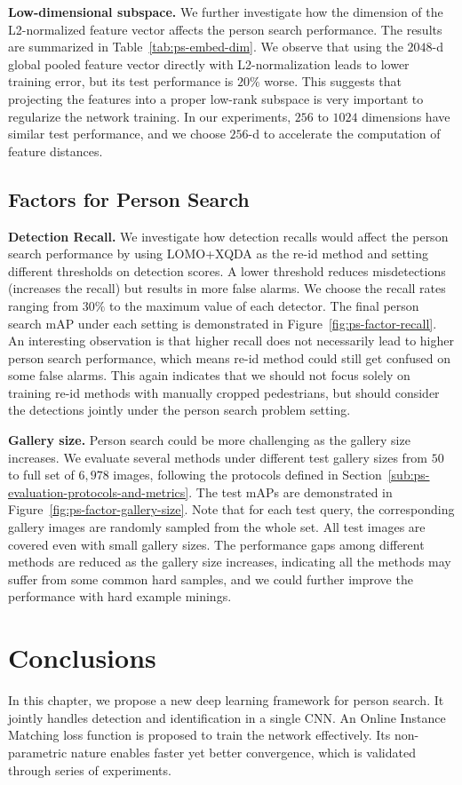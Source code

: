 \textbf{Low-dimensional subspace.} We further investigate how the dimension of the L2-normalized feature vector affects the person search performance. The results are summarized in Table~\ref{tab:ps-embed-dim}. We observe that using the $2048$-d global pooled feature vector directly with L2-normalization leads to lower training error, but its test performance is $20\%$ worse. This suggests that projecting the features into a proper low-rank subspace is very important to regularize the network training. In our experiments, $256$ to $1024$ dimensions have similar test performance, and we choose $256$-d to accelerate the computation of feature distances.

\subsection{Factors for Person Search} %
\label{sub:ps-factors-for-person-search}
\textbf{Detection Recall.} We investigate how detection recalls would affect the person search performance by using LOMO+XQDA as the re-id method and setting different thresholds on detection scores. A lower threshold reduces misdetections (increases the recall) but results in more false alarms. We choose the recall rates ranging from $30\%$ to the maximum value of each detector. The final person search mAP under each setting is demonstrated in Figure~\ref{fig:ps-factor-recall}. An interesting observation is that higher recall does not necessarily lead to higher person search performance, which means re-id method could still get confused on some false alarms. This again indicates that we should not focus solely on training re-id methods with manually cropped pedestrians, but should consider the detections jointly under the person search problem setting.

\textbf{Gallery size.} Person search could be more challenging as the gallery size increases. We evaluate several methods under different test gallery sizes from $50$ to full set of $6,978$ images, following the protocols defined in Section~\ref{sub:ps-evaluation-protocols-and-metrics}. The test mAPs are demonstrated in Figure~\ref{fig:ps-factor-gallery-size}. Note that for each test query, the corresponding gallery images are randomly sampled from the whole set. All test images are covered even with small gallery sizes. The performance gaps among different methods are reduced as the gallery size increases, indicating all the methods may suffer from some common hard samples, and we could further improve the performance with hard example minings.


\section{Conclusions} %
\label{sec:ps-conclusions}
In this chapter, we propose a new deep learning framework for person search. It jointly handles detection and identification in a single CNN. An Online Instance Matching loss function is proposed to train the network effectively. Its non-parametric nature enables faster yet better convergence, which is validated through series of experiments.
